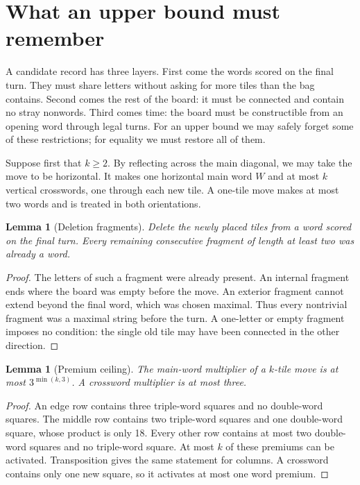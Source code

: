\documentclass{article}
\theoremstyle{plain}
\newtheorem{lemma}[theorem]{Lemma}
\begin{document}
\section{What an upper bound must remember}

A candidate record has three layers. First come the words scored on the final
turn. They must share letters without asking for more tiles than the bag
contains. Second comes the rest of the board: it must be connected and contain
no stray nonwords. Third comes time: the board must be constructible from an
opening word through legal turns. For an upper bound we may safely forget some
of these restrictions; for equality we must restore all of them.

Suppose first that $k\ge2$. By reflecting across the main diagonal, we may take
the move to be horizontal. It makes one horizontal main word $W$ and at most
$k$ vertical crosswords, one through each new tile. A one-tile move makes at
most two words and is treated in both orientations.

\begin{lemma}[Deletion fragments]\label{lem:deletion}
Delete the newly placed tiles from a word scored on the final turn. Every
remaining consecutive fragment of length at least two was already a word.
\end{lemma}
\begin{proof}
The letters of such a fragment were already present. An internal fragment ends
where the board was empty before the move. An exterior fragment cannot extend
beyond the final word, which was chosen maximal. Thus every nontrivial fragment
was a maximal string before the turn. A one-letter or empty fragment imposes no
condition: the single old tile may have been connected in the other direction.
\end{proof}

\begin{lemma}[Premium ceiling]\label{lem:premium}
The main-word multiplier of a $k$-tile move is at most
$3^{\min(k,3)}$. A crossword multiplier is at most three.
\end{lemma}
\begin{proof}
An edge row contains three triple-word squares and no double-word squares. The
middle row contains two triple-word squares and one double-word square, whose
product is only 18. Every other row contains at most two double-word squares and
no triple-word square. At most $k$ of these premiums can be activated.
Transposition gives the same statement for columns. A crossword contains only
one new square, so it activates at most one word premium.
\end{proof}
\end{document}
